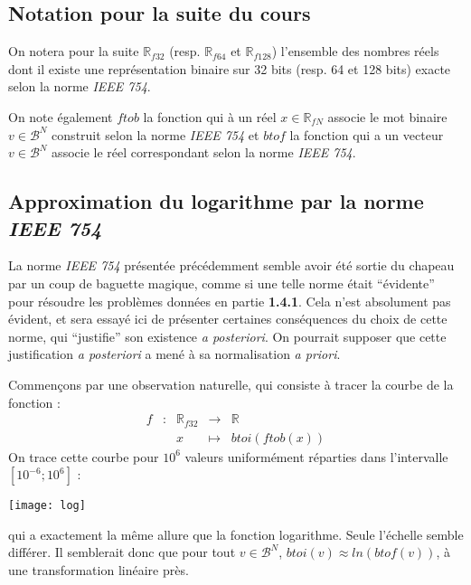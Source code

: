 \documentclass[../../main.tex]{subfiles}
\begin{document}
\subsection{Notation pour la suite du cours} \label{sub:notation_pour_la_suite_du_cours}
On notera pour la suite $\mathbb{R}_{f32}$ (resp. $\mathbb{R}_{f64}$ et $\mathbb{R}_{f128
}$) l'ensemble des nombres réels dont il existe une représentation binaire sur 32 bits (resp. 64 et 128 bits) exacte selon la norme \textit{IEEE 754}.

On note également $ftob$ la fonction qui à un réel $x\in\mathbb{R}_{fN}$ associe le mot binaire $v\in \mathcal{B}^N$ construit selon la norme \textit{IEEE 754} et $btof$ la fonction qui a un vecteur $v\in\mathcal{B}^{N}$ associe le réel correspondant selon la norme \textit{IEEE 754}.
\subsection{Approximation du logarithme par la norme \textit{IEEE 754}} \label{sub:approximation_du_logarithme_par_la_norme_ieee_754}
La norme \textit{IEEE 754} présentée précédemment semble avoir été sortie du chapeau par un coup de baguette magique, comme si une telle norme était ``évidente'' pour résoudre les problèmes données en partie \textbf{1.4.1}. Cela n'est absolument pas évident, et sera essayé ici de présenter certaines conséquences du choix de cette norme, qui ``justifie'' son existence \textit{a posteriori}. On pourrait supposer que cette justification \textit{a posteriori} a mené à sa normalisation \textit{a priori}.

Commençons par une observation naturelle, qui consiste à tracer la courbe de la fonction :
$$
\begin{array}{lclcl}
f & : & \mathbb{R}_{f32} & \rightarrow & \mathbb{R} \\
     &   & x & \mapsto & btoi(ftob(x))
\end{array}
$$
On trace cette courbe pour $10^6$ valeurs uniformément réparties dans l'intervalle $[10^{-6}; 10^6]$ :
\begin{center}
  \texttt{[image: log]}
\end{center}
qui a exactement la même allure que la fonction logarithme. Seule l'échelle semble différer. Il semblerait donc que pour tout $v\in\mathcal{B}^{N}$, $btoi(v)\approx ln(btof(v))$, à une transformation linéaire près.
\end{document}
